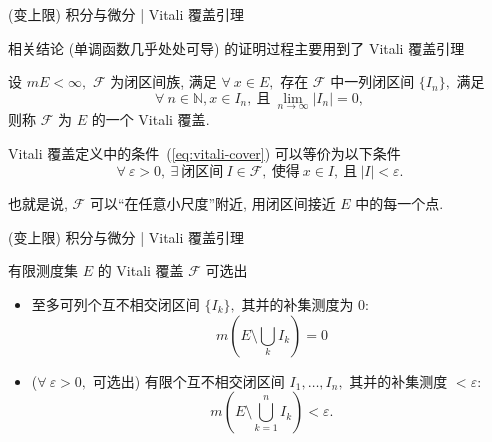 
\begin{frame}{(变上限) 积分与微分 | {\smaller[1] Vitali 覆盖引理}}

相关结论 (单调函数几乎处处可导) 的证明过程主要用到了 \alert{Vitali 覆盖引理}

\pause

\begin{Def}[Vitali 覆盖]
\label{def:vitali-cover}
设 $m E < \infty,$ $\mathcal{F}$ 为闭区间族, 满足 $\forall ~ x \in E,$ 存在 $\mathcal{F}$ 中一列闭区间 $\{ I_n \},$ 满足
\begin{equation}
\label{eq:vitali-cover}
\tag{*}
\forall ~ n \in \mathbb{N}, x \in I_n, ~ \text{且} ~ \lim_{n\to\infty} |I_n| = 0,
\end{equation}
则称 $\mathcal{F}$ 为 $E$ 的一个 \alert{Vitali 覆盖}.
\end{Def}

\pause

Vitali 覆盖定义中的条件~(\ref{eq:vitali-cover}) 可以等价为以下条件
\[
\forall ~ \varepsilon > 0, ~ \exists ~ \text{闭区间} ~ I \in \mathcal{F}, ~ \text{使得} ~ x \in I, ~ \text{且} ~ |I| < \varepsilon.
\]

\pause
\vspace{1em}

也就是说, $\mathcal{F}$ 可以“在任意小尺度”附近, 用闭区间接近 $E$ 中的每一个点.

\end{frame}


\begin{frame}{(变上限) 积分与微分 | {\smaller[1] Vitali 覆盖引理}}

\begin{thm}
有限测度集 $E$ 的 Vitali 覆盖 $\mathcal{F}$ 可选出
\begin{itemize}
\item 至多可列个互不相交闭区间 $\{ I_k \},$ 其并的补集测度为 $0:$
\[
m \left( E \setminus \bigcup_k I_k \right) = 0
\]
\item ($\forall ~ \varepsilon > 0,$ 可选出) 有限个互不相交闭区间 $I_1, \dots, I_n,$ 其并的补集测度 $< \varepsilon:$
\[
m \left( E \setminus \bigcup_{k=1}^n I_k \right) < \varepsilon.
\]
\end{itemize}
\end{thm}

\end{frame}

